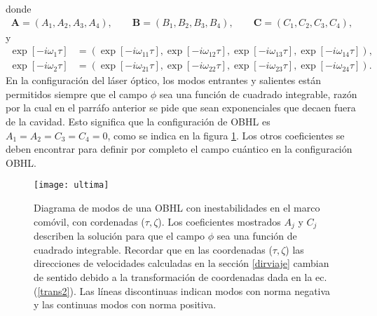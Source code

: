 donde
\begin{align}
\textbf{A}=(A_1,A_2,A_3,A_4),\qquad\textbf{B}=(B_1,B_2,B_3,B_4),\qquad\textbf{C}=(C_1,C_2,C_3,C_4),
\end{align}
y
\begin{align}
 \exp[-i{\omega}_1\tau]&=(\exp[-i\omega_{11}\tau],\exp[-i\omega_{12}\tau],\exp[-i\omega_{13}\tau],\exp[-i\omega_{14}\tau]),\\
 \exp[-i{\omega}_2\tau]&=(\exp[-i\omega_{21}\tau],\exp[-i\omega_{22}\tau],\exp[-i\omega_{23}\tau],\exp[-i\omega_{24}\tau]).
\end{align}
En la configuraci\'{o}n del l\'{a}ser \'{o}ptico, los modos entrantes y salientes están permitidos siempre que el campo $\phi$ sea una funci\'{o}n de cuadrado integrable, raz\'{o}n  por la cual en el parr\'{a}fo anterior se pide que sean exponenciales que decaen fuera de la cavidad. Esto significa que la configuración de OBHL es
$A_1 = A_2 = C_3 = C_4 = 0$, como se indica en la figura \ref{F56}. Los otros coeficientes se deben encontrar para definir por completo el campo cu\'{a}ntico en la configuraci\'{o}n OBHL.


\begin{figure}\centering
	\texttt{[image: ultima]}
	\caption{Diagrama de modos de una OBHL con inestabilidades en el marco com\'{o}vil, con cordenadas ($\tau,\zeta$). Los coeficientes mostrados $A_j$ y $C_j$ describen la soluci\'{o}n para que el campo $\phi$ sea una funci\'{o}n de cuadrado integrable. Recordar que en las coordenadas ($\tau, \zeta$) las direcciones de velocidades calculadas en la secci\'{o}n \ref{dirviaje} cambian de sentido debido a la transformaci\'{o}n de coordenadas dada en la ec. (\ref{trans2}). Las l\'{i}neas discontinuas indican modos con norma negativa y las continuas modos con norma positiva.}\label{F56}
\end{figure}


